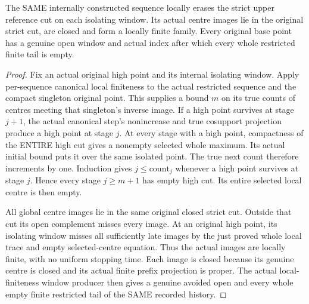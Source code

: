 \begin{theorem}
\label{hir:original-discrete-full-cut-local-erasure}
\leanok
The SAME internally constructed sequence locally erases the strict upper
reference cut on each isolating window. Its actual centre images lie in
the original strict cut, are closed and form a locally finite family.
Every original base point has a genuine open window and actual index after
which every whole restricted finite tail is empty.
\end{theorem}
\begin{proof}
Fix an actual original high point and its internal isolating window.
Apply per-sequence canonical local finiteness to the actual restricted
sequence and the compact singleton original point. This supplies a bound
$m$ on its true counts of centres meeting that singleton's inverse image.
If a high point survives at stage $j+1$, the actual canonical step's
nonincrease and true cosupport projection produce a high point at stage $j$.
At every stage with a high point, compactness of the ENTIRE high cut gives
a nonempty selected whole maximum. Its actual initial bound puts it over
the same isolated point. The true next count therefore increments by one.
Induction gives $j\leq\mathrm{count}_j$ whenever a high point survives at
stage $j$. Hence every stage $j\geq m+1$ has empty high cut. Its entire
selected local centre is then empty.

All global centre images lie in the same original closed strict cut.
Outside that cut its open complement misses every image. At an original
high point, its isolating window misses all sufficiently late images by
the just proved whole local trace and empty selected-centre equation.
Thus the actual images are locally finite, with no uniform stopping time.
Each image is closed because its genuine centre is closed and its actual
finite prefix projection is proper. The actual local-finiteness window
producer then gives a genuine avoided open and every whole empty finite
restricted tail of the SAME recorded history.
\end{proof}

